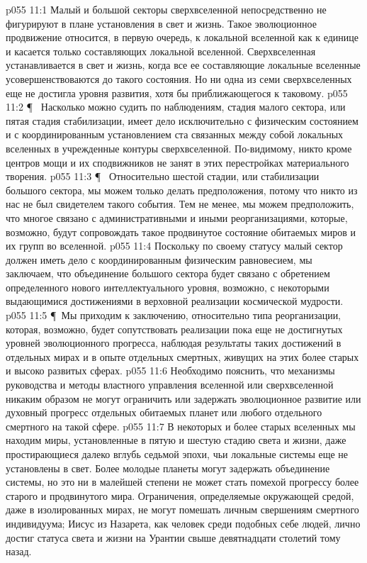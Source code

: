 \vs p055 11:1 Малый и большой секторы сверхвселенной непосредственно не фигурируют в плане установления в свет и жизнь. Такое эволюционное продвижение относится, в первую очередь, к локальной вселенной как к единице и касается только составляющих локальной вселенной. Сверхвселенная устанавливается в свет и жизнь, когда все ее составляющие локальные вселенные усовершенствоваются до такого состояния. Но ни одна из семи сверхвселенных еще не достигла уровня развития, хотя бы приближающегося к таковому.
\vs p055 11:2 \P\  Насколько можно судить по наблюдениям, стадия малого сектора, или пятая стадия стабилизации, имеет дело исключительно с физическим состоянием и с координированным установлением ста связанных между собой локальных вселенных в учрежденные контуры сверхвселенной. По\hyp{}видимому, никто кроме центров мощи и их сподвижников не занят в этих перестройках материального творения.
\vs p055 11:3 \P\  Относительно шестой стадии, или стабилизации большого сектора, мы можем только делать предположения, потому что никто из нас не был свидетелем такого события. Тем не менее, мы можем предположить, что многое связано с административными и иными реорганизациями, которые, возможно, будут сопровождать такое продвинутое состояние обитаемых миров и их групп во вселенной.
\vs p055 11:4 Поскольку по своему статусу малый сектор должен иметь дело с координированным физическим равновесием, мы заключаем, что объединение большого сектора будет связано с обретением определенного нового интеллектуального уровня, возможно, с некоторыми выдающимися достижениями в верховной реализации космической мудрости.
\vs p055 11:5 \P\ Мы приходим к заключению, относительно типа реорганизации, которая, возможно, будет сопутствовать реализации пока еще не достигнутых уровней эволюционного прогресса, наблюдая результаты таких достижений в отдельных мирах и в опыте отдельных смертных, живущих на этих более старых и высоко развитых сферах.
\vs p055 11:6 Необходимо пояснить, что механизмы руководства и методы властного управления вселенной или сверхвселенной никаким образом не могут ограничить или задержать эволюционное развитие или духовный прогресс отдельных обитаемых планет или любого отдельного смертного на такой сфере.
\vs p055 11:7 В некоторых и более старых вселенных мы находим миры, установленные в пятую и шестую стадию света и жизни, даже простирающиеся далеко вглубь седьмой эпохи, чьи локальные системы еще не установлены в свет. Более молодые планеты могут задержать объединение системы, но это ни в малейшей степени не может стать помехой прогрессу более старого и продвинутого мира. Ограничения, определяемые окружающей средой, даже в изолированных мирах, не могут помешать личным свершениям смертного индивидуума; Иисус из Назарета, как человек среди подобных себе людей, лично достиг статуса света и жизни на Урантии свыше девятнадцати столетий тому назад.
